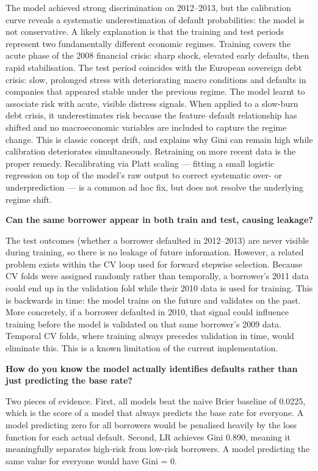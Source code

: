 \documentclass[a4paper,11pt]{article}
\begin{document}
The model achieved strong discrimination on 2012--2013, but the calibration curve
reveals a systematic underestimation of default probabilities: the model is not
conservative. A likely explanation is that the training and test periods represent
two fundamentally different economic regimes. Training covers the acute phase of
the 2008 financial crisis: sharp shock, elevated early defaults, then rapid
stabilisation. The test period coincides with the European sovereign debt crisis:
slow, prolonged stress with deteriorating macro conditions and defaults in companies
that appeared stable under the previous regime. The model learnt to associate risk
with acute, visible distress signals. When applied to a slow-burn debt crisis, it
underestimates risk because the feature--default relationship has shifted and no
macroeconomic variables are included to capture the regime change. This is classic concept drift, and explains why Gini can remain high while
calibration deteriorates simultaneously. Retraining on more recent data is the proper remedy. Recalibrating via Platt scaling
--- fitting a small logistic regression on top of the model's raw output to correct
systematic over- or underprediction --- is a common ad hoc fix, but does not resolve
the underlying regime shift.

\textbf{Can the same borrower appear in both train and test, causing leakage?}

The test outcomes (whether a borrower defaulted in 2012--2013) are never visible
during training, so there is no leakage of future information. However, a related
problem exists within the CV loop used for forward stepwise selection. Because
CV folds were assigned randomly rather than temporally, a borrower's 2011 data
could end up in the validation fold while their 2010 data is used for training.
This is backwards in time: the model trains on the future and validates on the past.
More concretely, if a borrower defaulted in 2010, that signal could influence
training before the model is validated on that same borrower's 2009 data.
Temporal CV folds, where training always precedes validation in time, would
eliminate this. This is a known limitation of the current implementation.

\textbf{How do you know the model actually identifies defaults rather than just predicting the base rate?}

Two pieces of evidence. First, all models beat the naive Brier baseline of 0.0225,
which is the score of a model that always predicts the base rate for everyone.
A model predicting zero for all borrowers would be penalised heavily by the loss
function for each actual default. Second, LR achieves Gini 0.890, meaning it
meaningfully separates high-risk from low-risk borrowers. A model predicting
the same value for everyone would have Gini = 0.
\end{document}

